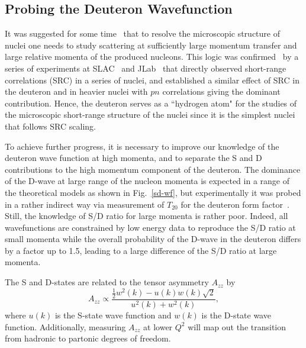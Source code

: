 \subsection{Probing the Deuteron Wavefunction}

It was suggested for some time~\cite{Frankfurt:1981mk} that to resolve the microscopic structure of nuclei one needs to study scattering at sufficiently large momentum transfer and large relative momenta of the produced nucleons. This logic was confirmed~\cite{Arrington:2011xs} by a series of experiments at SLAC~\cite{Frankfurt:1993sp} and JLab~\cite{Arrington:1998ps,Fomin:2011ng} that directly observed short-range correlations (SRC) in a series of nuclei, and established a similar effect of SRC in the deuteron and in heavier nuclei with $pn$ correlations giving the dominant contribution.  Hence, the deuteron serves as a ``hydrogen atom" for the studies of the microscopic short-range structure of the nuclei since it is the simplest nuclei that follows SRC scaling.

To achieve further progress, it is necessary to improve our knowledge of the deuteron wave function at high momenta, and to separate the S and D contributions to the high momentum component of the deuteron. The dominance of the D-wave at large range of the nucleon momenta is expected in a range of the theoretical models as shown in Fig.~\ref{sd-wf}, but experimentally it was probed in a rather indirect way via measurement of $T_{20}$ for the deuteron form factor~\cite{Garcon:2001sz}. Still, the knowledge of S/D ratio for large momenta is rather poor. Indeed, all wavefunctions are constrained by low energy data to reproduce the S/D ratio at small momenta while the overall probability of the D-wave in the deuteron differs by a factor up to 1.5, leading to a large difference of the S/D ratio at large momenta.

The S and D-states are related to the tensor asymmetry $A_{zz}$ by~\cite{Frankfurt:1988nt}
\begin{equation}
	A_{zz} \propto \frac{\frac{1}{2}w^2(k)-u(k)w(k)\sqrt{2}}{u^2(k)+w^2(k)},
\end{equation}
where $u(k)$ is the S-state wave function and $w(k)$ is the D-state wave function. Additionally, measuring $A_{zz}$ at lower $Q^2$ will map out the transition from hadronic to partonic degrees of freedom.

